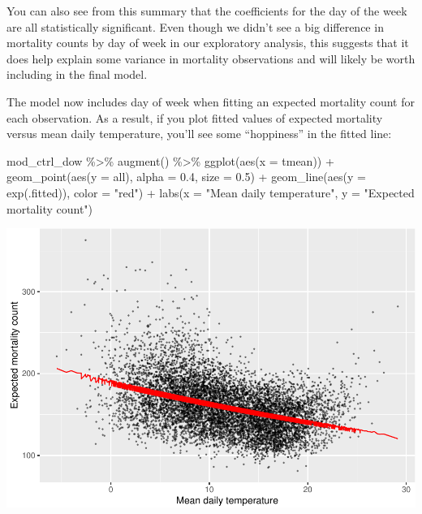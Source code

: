 \documentclass[
]{book}
\newenvironment{Shaded}{\begin{snugshade}}{\end{snugshade}}
\newcommand{\AttributeTok}[1]{\textcolor[rgb]{0.77,0.63,0.00}{#1}}
\newcommand{\FloatTok}[1]{\textcolor[rgb]{0.00,0.00,0.81}{#1}}
\newcommand{\FunctionTok}[1]{\textcolor[rgb]{0.00,0.00,0.00}{#1}}
\newcommand{\NormalTok}[1]{#1}
\newcommand{\SpecialCharTok}[1]{\textcolor[rgb]{0.00,0.00,0.00}{#1}}
\newcommand{\StringTok}[1]{\textcolor[rgb]{0.31,0.60,0.02}{#1}}
\begin{document}
You can also see from this summary that the coefficients for the day of the
week are all statistically significant. Even though we didn't see a big
difference in mortality counts by day of week in our exploratory analysis,
this suggests that it does help explain some variance in mortality observations
and will likely be worth including in the final model.

The model now includes day of week when fitting an expected mortality count
for each observation. As a result, if you plot fitted values of expected
mortality versus mean daily temperature, you'll see some ``hoppiness'' in the
fitted line:

\begin{Shaded}
\begin{Highlighting}[]
\NormalTok{mod\_ctrl\_dow }\SpecialCharTok{\%\textgreater{}\%} 
  \FunctionTok{augment}\NormalTok{() }\SpecialCharTok{\%\textgreater{}\%} 
  \FunctionTok{ggplot}\NormalTok{(}\FunctionTok{aes}\NormalTok{(}\AttributeTok{x =}\NormalTok{ tmean)) }\SpecialCharTok{+} 
  \FunctionTok{geom\_point}\NormalTok{(}\FunctionTok{aes}\NormalTok{(}\AttributeTok{y =}\NormalTok{ all), }\AttributeTok{alpha =} \FloatTok{0.4}\NormalTok{, }\AttributeTok{size =} \FloatTok{0.5}\NormalTok{) }\SpecialCharTok{+} 
  \FunctionTok{geom\_line}\NormalTok{(}\FunctionTok{aes}\NormalTok{(}\AttributeTok{y =} \FunctionTok{exp}\NormalTok{(.fitted)), }\AttributeTok{color =} \StringTok{"red"}\NormalTok{) }\SpecialCharTok{+} 
  \FunctionTok{labs}\NormalTok{(}\AttributeTok{x =} \StringTok{"Mean daily temperature"}\NormalTok{, }\AttributeTok{y =} \StringTok{"Expected mortality count"}\NormalTok{)}
\end{Highlighting}
\end{Shaded}

\includegraphics{adv_epi_analysis_files/figure-latex/unnamed-chunk-40-1.pdf}
\end{document}
